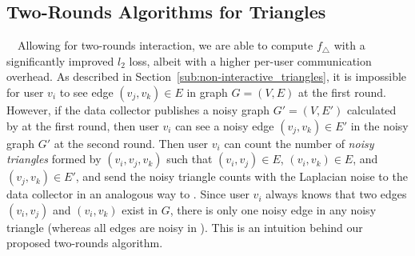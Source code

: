 
\subsection{Two-Rounds Algorithms for Triangles}
\label{sub:two_rounds}

~~Allowing for 
two-rounds interaction, 
we are able to compute $f_{\triangle}$ with
a significantly improved $l_2$ loss, albeit with a higher per-user
communication overhead.
As described in Section~\ref{sub:non-interactive_triangles}, it is impossible for user $v_i$ to see edge $(v_j, v_k) \in E$ in graph $G=(V,E)$ at the first round. 
However, if 
the data collector publishes a noisy graph $G'=(V,E')$ calculated by  at the first round, then 
user $v_i$ can see a noisy edge $(v_j, v_k) \in E'$ in the noisy graph $G'$ at the second round. 
Then user $v_i$ can count the number of \textit{noisy triangles} formed by
$(v_i, v_j, v_k)$ such that $(v_i,v_j) \in E$, $(v_i,v_k) \in E$, and $(v_j,v_k)
\in E'$, and send the noisy triangle counts with the Laplacian noise to the data
collector in an analogous way to .
Since user $v_i$ always knows that two edges $(v_i,v_j)$ and $(v_i,v_k)$ exist in $G$, 
there is only one noisy edge in any noisy triangle 
(whereas all edges are noisy in ).
This is an intuition behind our proposed two-rounds algorithm. 

